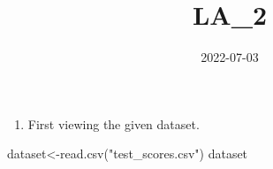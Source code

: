 \documentclass[
]{article}
\title{LA\_2}
\author{}
\date{\vspace{-2.5em}2022-07-03}
\newenvironment{Shaded}{\begin{snugshade}}{\end{snugshade}}
\newcommand{\FunctionTok}[1]{\textcolor[rgb]{0.00,0.00,0.00}{#1}}
\newcommand{\NormalTok}[1]{#1}
\newcommand{\OtherTok}[1]{\textcolor[rgb]{0.56,0.35,0.01}{#1}}
\newcommand{\StringTok}[1]{\textcolor[rgb]{0.31,0.60,0.02}{#1}}
\providecommand{\tightlist}{%
  \setlength{\itemsep}{0pt}\setlength{\parskip}{0pt}}
\begin{document}
\maketitle

\begin{enumerate}
\def\labelenumi{\arabic{enumi}.}
\tightlist
\item
  First viewing the given dataset.
\end{enumerate}

\begin{Shaded}
\begin{Highlighting}[]
\NormalTok{dataset}\OtherTok{\textless{}{-}}\FunctionTok{read.csv}\NormalTok{(}\StringTok{"test\_scores.csv"}\NormalTok{)}
\NormalTok{dataset}
\end{Highlighting}
\end{Shaded}
\end{document}
